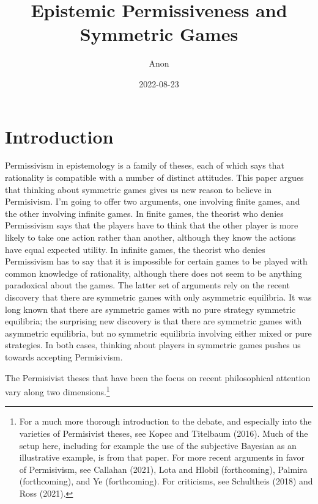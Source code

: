 \documentclass[
  11pt,
]{article}
\title{Epistemic Permissiveness and Symmetric Games}
\author{Anon}
\date{2022-08-23}
\begin{document}
\maketitle

\hypertarget{introduction}{%
\section{Introduction}\label{introduction}}

Permissivism in epistemology is a family of theses, each of which says that rationality is compatible with a number of distinct attitudes. This paper argues that thinking about symmetric games gives us new reason to believe in Permisivism. I'm going to offer two arguments, one involving finite games, and the other involving infinite games. In finite games, the theorist who denies Permissivism says that the players have to think that the other player is more likely to take one action rather than another, although they know the actions have equal expected utility. In infinite games, the theorist who denies Permissivism has to say that it is impossible for certain games to be played with common knowledge of rationality, although there does not seem to be anything paradoxical about the games. The latter set of arguments rely on the recent discovery that there are symmetric games with only asymmetric equilibria. It was long known that there are symmetric games with no pure strategy symmetric equilibria; the surprising new discovery is that there are symmetric games with asymmetric equilibria, but no symmetric equilibria involving either mixed or pure strategies. In both cases, thinking about players in symmetric games pushes us towards accepting Permisivism.

The Permisivist theses that have been the focus on recent philosophical attention vary along two dimensions.\footnote{For a much more thorough introduction to the debate, and especially into the varieties of Permisivist theses, see Kopec and Titelbaum (2016). Much of the setup here, including for example the use of the subjective Bayesian as an illustrative example, is from that paper. For more recent arguments in favor of Permisivism, see Callahan (2021), Lota and Hlobil (forthcoming), Palmira (forthcoming), and Ye (forthcoming). For criticisms, see Schultheis (2018) and Ross (2021).}
\end{document}

